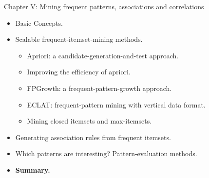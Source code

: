 \documentclass[aspectratio=169,t,xcolor=dvipsnames]{beamer}
\begin{document}
  {
    \begin{frame}{Chapter V: Mining frequent patterns, associations and correlations}
        \begin{itemize}
            \item Basic Concepts.
            \item Scalable frequent-itemset-mining methods.
            \begin{itemize}
              \item Apriori: a candidate-generation-and-test approach.
              \item Improving the efficiency of apriori.
              \item FPGrowth:  a frequent-pattern-growth approach.
              \item ECLAT: frequent-pattern mining with vertical data format.
              \item Mining closed itemsets and max-itemsets.
            \end{itemize}
            \item Generating association rules from frequent itemsets.
            \item Which patterns are interesting? Pattern-evaluation methods.
            \item \textbf{Summary.}
        \end{itemize}
    \end{frame}
  }
\end{document}
